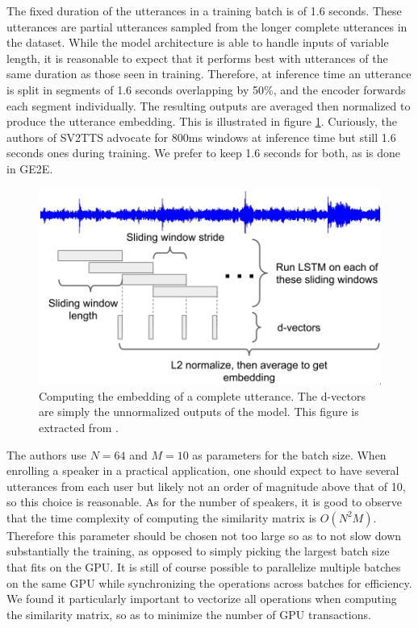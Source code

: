 \documentclass[a4paper, oneside, 12pt, english]{article}
\begin{document}
The fixed duration of the utterances in a training batch is of 1.6 seconds. These utterances are partial utterances sampled from the longer complete utterances in the dataset. While the model architecture is able to handle inputs of variable length, it is reasonable to expect that it performs best with utterances of the same duration as those seen in training. Therefore, at inference time an utterance is split in segments of 1.6 seconds overlapping by 50\%, and the encoder forwards each segment individually. The resulting outputs are averaged then normalized to produce the utterance embedding. This is illustrated in figure \ref{encoder_inference}. Curiously, the authors of SV2TTS advocate for 800ms windows at inference time but still 1.6 seconds ones during training. We prefer to keep 1.6 seconds for both, as is done in GE2E.

\begin{figure}[h]
	\centering
	\includegraphics[width=0.65\linewidth]{images/encoder_inference.png}
	\caption{Computing the embedding of a complete utterance. The d-vectors are simply the unnormalized outputs of the model. This figure is extracted from \citep{GE2E}.}
	\label{encoder_inference}
\end{figure}

The authors use $N = 64$ and $M = 10$ as parameters for the batch size. When enrolling a speaker in a practical application, one should expect to have several utterances from each user but likely not an order of magnitude above that of 10, so this choice is reasonable. As for the number of speakers, it is good to observe that the time complexity of computing the similarity matrix is $O(N^2M)$. Therefore this parameter should be chosen not too large so as to not slow down substantially the training, as opposed to simply picking the largest batch size that fits on the GPU. It is still of course possible to parallelize multiple batches on the same GPU while synchronizing the operations across batches for efficiency. We found it particularly important to vectorize all operations when computing the similarity matrix, so as to minimize the number of GPU transactions.
\end{document}

